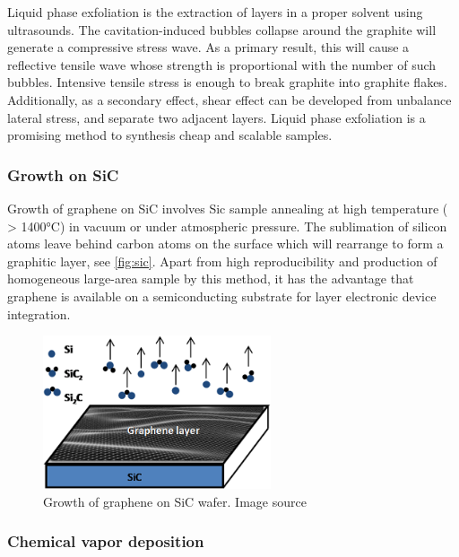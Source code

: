 Liquid phase exfoliation is the extraction of layers in a proper solvent using ultrasounds. The cavitation-induced bubbles collapse around the graphite will generate a compressive stress wave. As a primary result, this will cause a reflective tensile wave whose strength is proportional with the number of such bubbles. Intensive tensile stress is enough to break graphite into graphite flakes. Additionally, as a secondary effect, shear effect can be developed from unbalance lateral stress, and separate two adjacent layers. Liquid phase exfoliation is a promising method to synthesis cheap and scalable samples. 

\subsubsection{Growth on SiC}

Growth of graphene on SiC involves Sic sample annealing at high temperature ( > 1400\si{\celsius}) in vacuum or under atmospheric pressure. The sublimation of silicon atoms leave behind carbon atoms on the surface which will rearrange to form a graphitic layer\cite{Mishra2016}, see \autoref{fig:sic}. Apart from high reproducibility and production of homogeneous large-area sample by this method, it has the advantage that graphene is available on a semiconducting substrate for layer electronic device integration. 

\begin{figure}[htbp!] 
\centering  
\includegraphics[width=0.6\textwidth]{gr-sic.png}
\caption{Growth of graphene on SiC wafer. Image source \cite{mishra2016graphene}}  
\label{fig:sic}
\end{figure} 

\subsubsection{Chemical vapor deposition}


